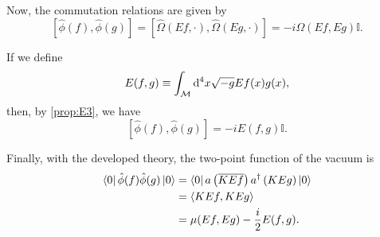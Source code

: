 Now, the commutation relations are given by
\begin{equation}
    \left[\hat{\phi}(f),\hat{\phi}(g)\right]=\left[\hat{\Omega}\left(Ef,\cdot\right),\hat{\Omega}\left(Eg,\cdot\right)\right]=-i\Omega(Ef,Eg)\mathbb{I}.
\end{equation}

If we define
\begin{equation}
    E(f,g)\equiv\int_{\mathcal{M}} \mathrm{d}^4x\sqrt{-g}Ef(x)g(x),
\end{equation}
then, by \cref{prop:E3}, we have
\begin{equation}
    \left[\hat{\phi}(f),\hat{\phi}(g)\right]=-iE(f,g)\mathbb{I}.
    \label{eq:comutação-phi}
\end{equation}

Finally, with the developed theory, the two-point function of the vacuum is
\begin{subequations}
    \begin{align}
        \bra{0}\hat{\phi}(f)\hat{\phi}(g)\ket{0}&=\bra{0}a\left(\overline{KEf}\right)a^\dagger\left(KEg\right)\ket{0}\\
        &=\langle KEf,KEg\rangle\\
        &=\mu(Ef,Eg)-\frac{i}{2}E(f,g).
    \end{align}
\end{subequations}

